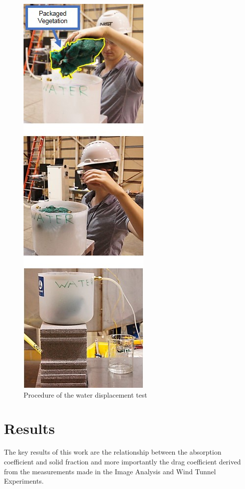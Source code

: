 \documentclass[12pt]{article}
\begin{document}
\begin{figure} [!]
	\centering 	\includegraphics[height=0.95\textheight,keepaspectratio]{Picture7.jpg}
	\caption{Procedure of the water displacement test}
	\label{fig:wdt}
\end{figure}

\pagebreak



\section{Results}
\label{sec:results}

The key results of this work are the relationship between the absorption coefficient and solid fraction and more importantly the drag coefficient derived from the measurements made in the Image Analysis and Wind Tunnel Experiments.
\end{document}
